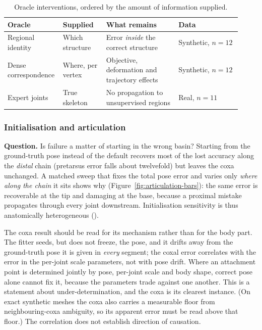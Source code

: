 \begin{table}[!htb]
\centering
\caption{Oracle interventions, ordered by the amount of information supplied.}
\label{tab:oracles}
\begin{tabular}{@{}L{0.18\linewidth}L{0.18\linewidth}L{0.30\linewidth}L{0.26\linewidth}@{}}
\toprule
\textbf{Oracle} & \textbf{Supplied} & \textbf{What remains} & \textbf{Data}\\
\midrule
Regional identity & Which structure & Error \emph{inside} the correct
 structure & Synthetic, $n=12$\\
Dense correspondence & Where, per vertex & Objective, deformation and
 trajectory effects & Synthetic, $n=12$\\
Expert joints & True skeleton & No propagation to unsupervised regions &
 Real, $n=11$\\
\bottomrule
\end{tabular}
\end{table}

\subsubsection{Initialisation and articulation}
\label{sec:articulation}

\textbf{Question.} Is failure a matter of starting in the wrong basin?
Starting from the ground-truth pose instead of the default recovers most of
the lost accuracy along the \emph{distal} chain (pretarsus error falls about
twelvefold) but leaves the coxa unchanged. A matched sweep that fixes the total
pose error and varies only \emph{where along the chain} it sits shows why
(Figure~\ref{fig:articulation-bars}): the same error is recoverable at the tip
and damaging at the base, because a proximal mistake propagates through every
joint downstream. Initialisation sensitivity is thus anatomically
heterogeneous ().

The coxa result should be read for its mechanism rather than for the body part.
The fitter seeds, but does not freeze, the pose, and it drifts away from the
ground-truth pose it is given in \emph{every} segment; the coxal error
correlates with the error in the per-joint scale parameters, not with pose
drift. Where an attachment point is determined jointly by pose, per-joint scale
and body shape, correct pose alone cannot fix it, because the parameters
trade against one another. This is a statement about under-determination, and
the coxa is its clearest instance. (On exact synthetic meshes the coxa also
carries a measurable floor from neighbouring-coxa ambiguity, so its apparent
error must be read above that floor.) The correlation does not establish
direction of causation.

